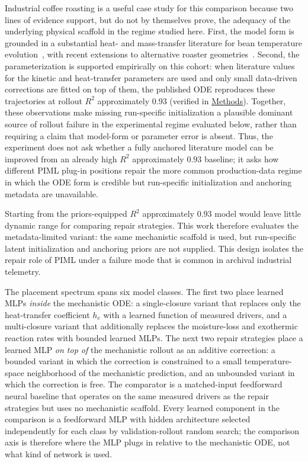 \documentclass[fleqn,10pt]{wlscirep}
\newcommand{\Methods}{\hyperref[sec:methods]{Methods}}
\begin{document}
Industrial coffee roasting is a useful case study for this comparison because two lines of evidence support, but do not by themselves prove, the adequacy of the underlying physical scaffold in the regime studied here. First, the model form is grounded in a substantial heat- and mass-transfer literature for bean temperature evolution~\cite{schwartzberg2002,vosloo2017,putranto2012,hernandez2007,fabbri2011,fadai2017}, with recent extensions to alternative roaster geometries~\cite{alshemmeri2025}. Second, the parameterization is supported empirically on this cohort: when literature values for the kinetic and heat-transfer parameters are used and only small data-driven corrections are fitted on top of them, the published ODE reproduces these trajectories at rollout $R^2$ approximately $0.93$ (verified in \Methods). Together, these observations make missing run-specific initialization a plausible dominant source of rollout failure in the experimental regime evaluated below, rather than requiring a claim that model-form or parameter error is absent. Thus, the experiment does not ask whether a fully anchored literature model can be improved from an already high $R^2$ approximately $0.93$ baseline; it asks how different PIML plug-in positions repair the more common production-data regime in which the ODE form is credible but run-specific initialization and anchoring metadata are unavailable.

Starting from the priors-equipped $R^2$ approximately $0.93$ model would leave little dynamic range for comparing repair strategies. This work therefore evaluates the metadata-limited variant: the same mechanistic scaffold is used, but run-specific latent initialization and anchoring priors are not supplied. This design isolates the repair role of PIML under a failure mode that is common in archival industrial telemetry.

The placement spectrum spans six model classes. The first two place learned MLPs \emph{inside} the mechanistic ODE: a single-closure variant that replaces only the heat-transfer coefficient $h_e$ with a learned function of measured drivers, and a multi-closure variant that additionally replaces the moisture-loss and exothermic reaction rates with bounded learned MLPs. The next two repair strategies place a learned MLP \emph{on top of} the mechanistic rollout as an additive correction: a bounded variant in which the correction is constrained to a small temperature-space neighborhood of the mechanistic prediction, and an unbounded variant in which the correction is free. The comparator is a matched-input feedforward neural baseline that operates on the same measured drivers as the repair strategies but uses no mechanistic scaffold. Every learned component in the comparison is a feedforward MLP with hidden architecture selected independently for each class by validation-rollout random search; the comparison axis is therefore where the MLP plugs in relative to the mechanistic ODE, not what kind of network is used.
\end{document}
